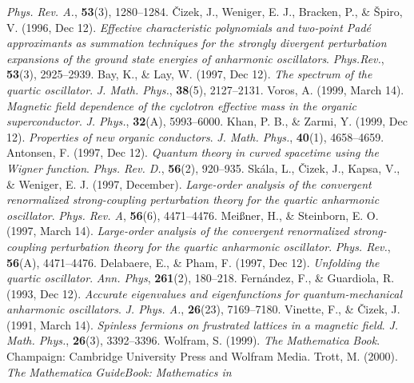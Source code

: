 \documentclass{article}
\begin{document}
\begin{thebibliography}{000}
\textit{Phys. Rev. A.}, \textbf{53}(3), 1280--1284.\label{Ho96}
 \v{C}izek, J., Weniger, E. J., Bracken, P., \& \v{S}piro,
V. (1996, Dec 12). \textit{Effective characteristic polynomials
and two-point Pad\'e approximants as summation techniques for the
strongly divergent perturbation expansions of the ground state energies
of anharmonic oscillators}. \textit{Phys.Rev.}, \textbf{53}(3),
2925--2939.\label{Cizek}
 Bay, K., \& Lay, W. (1997, Dec 12). \textit{The spectrum
of the quartic oscillator}. \textit{J. Math. Phys.}, \textbf{38}(5),
2127--2131.\label{Bay}
 Voros, A. (1999, March 14). \textit{Magnetic field
dependence of the cyclotron effective mass in the organic superconductor}.
\textit{J. Phys.}, \textbf{32}(A), 5993--6000.\label{Voros99}
 Khan, P. B., \& Zarmi, Y. (1999, Dec 12). \textit{Properties
of new organic conductors}. \textit{J. Math. Phys.}, \textbf{40}(1),
4658--4659.\label{Khan}
 Antonsen, F. (1997, Dec 12). \textit{Quantum theory
in curved spacetime using the Wigner function}. \textit{Phys. Rev.
D.}, \textbf{56}(2), 920--935.\label{Antons}
 Sk\'ala, L., \v{C}izek, J., Kapsa, V., \& Weniger,
E. J. (1997, December). \textit{Large-order analysis of the convergent
renormalized strong-coupling perturbation theory for the quartic
anharmonic oscillator}. \textit{Phys. Rev. A}, \textbf{56}(6), 4471--4476.\label{Skala}
 Mei{\ss}ner, H., \& Steinborn, E. O. (1997, March
14). \textit{Large-order analysis of the convergent renormalized
strong-coupling perturbation theory for the quartic anharmonic oscillator}.
\textit{Phys. Rev.}, \textbf{56}(A), 4471--4476.\label{Meiszn}
 Delabaere, E., \& Pham, F. (1997, Dec 12). \textit{Unfolding
the quartic oscillator}. \textit{Ann. Phys}, \textbf{261}(2), 180--218.\label{Delaba}
 Fern\'andez, F., \& Guardiola, R. (1993, Dec 12).
\textit{Accurate eigenvalues and eigenfunctions for quantum-mechanical
anharmonic oscillators}. \textit{J. Phys. A.}, \textbf{26}(23),
7169--7180.\label{Fernan}
 Vinette, F., \& \v{C}izek, J. (1991, March 14).
\textit{Spinless fermions on frustrated lattices in a magnetic field}.
\textit{J. Math. Phys.}, \textbf{26}(3), 3392--3396.\label{Vinett}
 Wolfram, S. (1999). \textit{The }\textit{{\itshape
Mathematica}}\textit{ Book}. Champaign: Cambridge University Press
and Wolfram Media.\label{Wolfram99}
 Trott, M. (2000). \textit{The }\textit{{\itshape
Mathematica}}\textit{ GuideBook: Mathematics in }\textit{{\itshape
}}
\end{thebibliography}
\end{document}
